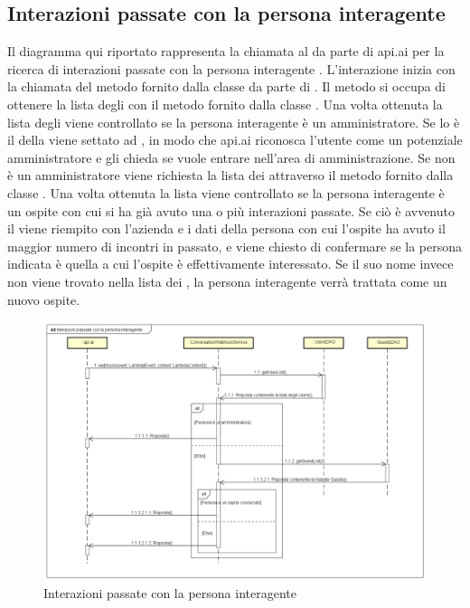 \subsection{Interazioni passate con la persona interagente}
Il diagramma qui riportato rappresenta la chiamata al  da parte di api.ai per la ricerca di interazioni passate con la persona interagente . L'interazione inizia con la chiamata del metodo  fornito dalla classe  da parte di . Il metodo si occupa di ottenere la lista degli  con il metodo  fornito dalla classe . Una volta ottenuta la lista degli  viene controllato se la persona interagente è un amministratore. Se lo è il  della  viene settato ad , in modo che api.ai riconosca l'utente come un potenziale amministratore e gli chieda se vuole entrare nell'area di amministrazione. Se non è un amministratore viene richiesta la lista dei  attraverso il metodo  fornito dalla classe . Una volta ottenuta la lista viene controllato se la persona interagente è un ospite con cui si ha già avuto una o più interazioni passate. Se ciò è avvenuto il  viene riempito con l'azienda e i dati della persona con cui l'ospite ha avuto il maggior numero di incontri in passato, e viene chiesto di confermare se la persona indicata è quella a cui l'ospite è effettivamente interessato. Se il suo nome invece non viene trovato nella lista dei , la persona interagente verrà trattata come un nuovo ospite.
\begin{figure}[h] \centering \includegraphics[width=\textwidth,height=\textheight,keepaspectratio]{images/diagrams/back-end/Ufficial_Backend/Interazionipassateconlapersonainteragente.png}
\caption{Interazioni passate con la persona interagente}
\end{figure}
\newpage
